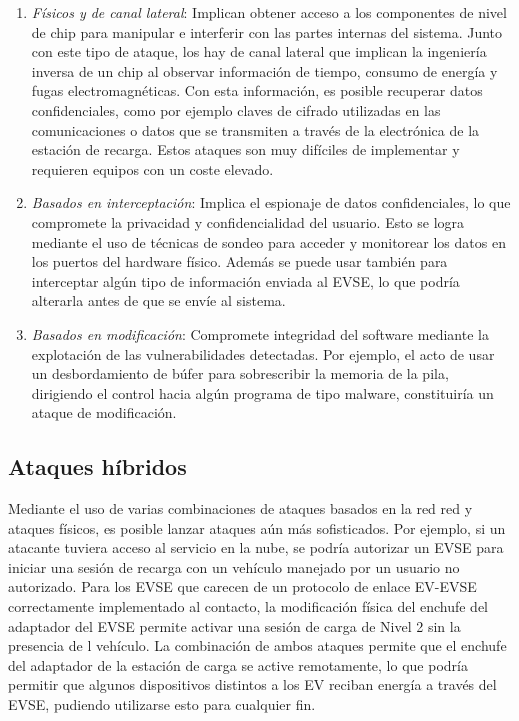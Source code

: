 \documentclass[12pt,a4paper,onecolumn,oneside]{report}
\begin{document}
\begin{enumerate}

\item \textit{Físicos y de canal lateral}: Implican obtener acceso a los componentes de nivel de chip para manipular e interferir con las partes internas del sistema. Junto con este tipo de ataque, los hay de canal lateral que implican la ingeniería inversa de un chip al observar información de tiempo, consumo de energía y fugas electromagnéticas. Con esta información, es posible recuperar datos confidenciales, como por ejemplo claves de cifrado utilizadas en las comunicaciones o datos que se transmiten a través de la electrónica de la estación de recarga. Estos ataques son muy difíciles de implementar y requieren equipos con un coste elevado.

\item \textit{Basados en interceptación}: Implica el espionaje de datos confidenciales, lo que compromete la privacidad y confidencialidad del usuario. Esto se logra mediante el uso de técnicas de sondeo para acceder y monitorear los datos en los puertos del hardware físico. Además se puede usar también para interceptar algún tipo de información enviada al EVSE, lo que podría alterarla antes de que se envíe al sistema.

\item \textit{Basados en modificación}: Compromete integridad del software mediante la explotación de las vulnerabilidades detectadas. Por ejemplo, el acto de usar un desbordamiento de búfer para sobrescribir la memoria de la pila, dirigiendo el control hacia algún programa de tipo malware, constituiría un ataque de modificación.

\end{enumerate}



\subsection{Ataques híbridos}

Mediante el uso de varias combinaciones de ataques basados en la red red y ataques físicos, es posible lanzar ataques aún más sofisticados. Por ejemplo, si un atacante tuviera acceso al servicio en la nube, se podría autorizar un EVSE para iniciar una sesión de recarga con un vehículo manejado por un usuario no autorizado. Para los EVSE que carecen de un protocolo de enlace EV-EVSE correctamente implementado al contacto, la modificación física del enchufe del adaptador del EVSE permite activar una sesión de carga de Nivel 2 sin la presencia de l vehículo. La combinación de ambos ataques permite que el enchufe del adaptador de la estación de carga se active remotamente, lo que podría permitir que algunos dispositivos distintos a los EV reciban energía a través del EVSE, pudiendo utilizarse esto para cualquier fin.
\end{document}
